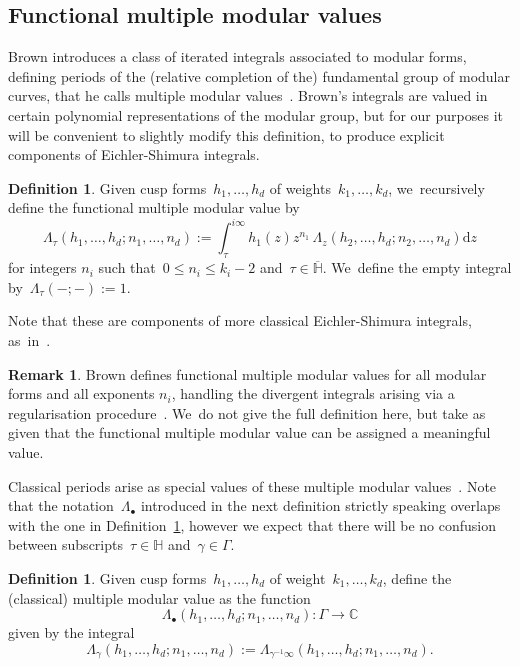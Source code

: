 \documentclass[10pt,a4paper]{article}
\numberwithin{equation}{section}
\let\oldbullet\bullet
\renewcommand{\bullet}{{\scriptscriptstyle\oldbullet}}
\theoremstyle{plain}
\theoremstyle{definition}
\newtheorem{definition}[theoremcounter]{Definition}
\newtheorem{remark}[theoremcounter]{Remark}
\newcommand{\tx}{\text}
\newcommand{\bbC}{\ensuremath{\mathbb{C}}}
\newcommand{\rmd}{\ensuremath{\mathrm{d}}}
\let\ov\overline
\newcommand{\defcol}{\mathrel{:}}
\newcommand{\defeq}{:=}
\newcommand{\HS}{\ensuremath{\mathbb{H}}}
\let\Ga\Gamma
\let\ga\gamma
\newcommand{\dz}{\rmd z}
\begin{document}
\subsection{Functional multiple modular values}
\label{ssec:preliminaries:multi_modular}

Brown introduces a class of iterated integrals associated to modular forms, defining periods of the (relative completion of the) fundamental group of modular curves, that he calls multiple modular values~\cite{brown17}. Brown's integrals are valued in certain polynomial representations of the modular group, but for our purposes it will be convenient to slightly modify this definition, to produce explicit components of Eichler-Shimura integrals.

\begin{definition}
\label{def:func_mult_mod}
Given cusp forms~$h_1,\ldots,h_d$ of weights~$k_1,\ldots,k_d$, we~recursively define the functional multiple modular value by
\begin{equation*}
\Lambda_\tau(h_1,\ldots,h_d;n_1,\ldots,n_d)
:=
\int_\tau^{i\infty} h_1(z) z^{n_1}\, \Lambda_z(h_2,\ldots,h_d;n_2,\ldots,n_d) \dz
\end{equation*}
for integers $n_i$ such that~$0\leq n_i\leq k_i-2$ and~$\tau\in\ov{\HS}$. We~define the empty integral by~$\Lambda_\tau(-;-):=1$.
\end{definition}

Note that these are components of more classical Eichler-Shimura integrals, as~in~\cite{brown17}.

\begin{remark}
Brown defines functional multiple modular values for all modular forms and all exponents $n_i$, handling the divergent integrals arising via a regularisation procedure~\cite{brown17,brown19,matthes22}. We~do not give the full definition here, but take as given that the functional multiple modular value can be assigned a meaningful value.
\end{remark}

Classical periods arise as special values of these multiple modular values~\cite{brown17,brown19}. Note that the notation~$\Lambda_\bullet$ introduced in the next definition strictly speaking overlaps with the one in Definition~\ref{def:func_mult_mod}, however we expect that there will be no confusion between subscripts~$\tau \in \HS$ and~$\ga \in \Ga$.

\begin{definition}
\label{def:multi_modular_value}
Given cusp forms~$h_1,\ldots,h_d$ of weight~$k_1,\ldots,k_d$, define the (classical) multiple modular value as the function
\begin{equation*}
\Lambda_\bullet(h_1,\ldots,h_d;n_1,\ldots,n_d)
\defcol
\Ga \to \bbC
\end{equation*}
given by the integral
\begin{equation*}
\Lambda_\ga(h_1,\ldots,h_d;n_1,\ldots,n_d)
\defeq
\Lambda_{\ga^{-1}\infty}(h_1,\ldots,h_d;n_1,\ldots,n_d)
\tx{.}
\end{equation*}
\end{definition}
\end{document}
